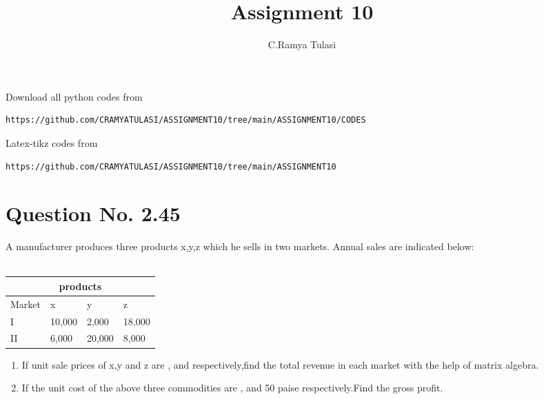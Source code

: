 \documentclass[journal,12pt,twocolumn]{IEEEtran}
\begin{document}
     \def\rightbox#1{\makebox[0in][r]{#1}}
     \def\centbox#1{\makebox[0in]{#1}}
     \def\topbox#1{\raisebox{-\baselineskip}[0in][0in]{#1}}
     \def\midbox#1{\raisebox{-0.5\baselineskip}[0in][0in]{#1}}
\vspace{3cm}
\title{Assignment 10}
\author{C.Ramya Tulasi}
\maketitle
\newpage
\bigskip
\renewcommand{\thefigure}{\theenumi}
\renewcommand{\thetable}{\theenumi}
Download all python codes from 
\begin{lstlisting}
https://github.com/CRAMYATULASI/ASSIGNMENT10/tree/main/ASSIGNMENT10/CODES
\end{lstlisting}
%
Latex-tikz codes from 
%
\begin{lstlisting}
https://github.com/CRAMYATULASI/ASSIGNMENT10/tree/main/ASSIGNMENT10
\end{lstlisting}
%
\section{Question No. 2.45}

A manufacturer produces three products x,y,z which he sells in two markets. Annual sales are indicated below:
\\\\
\begin{tabular}{ |p{2cm}||p{1.5cm}|p{1.5cm}|p{1.5cm}|}
 \hline
 \multicolumn{4}{|c|}{products}\\
 \hline
Market & x & y &z\\
 \hline
I &10,000 &2,000 &18,000\\
\hline
 II &6,000 &20,000 &8,000\\
\hline
\end{tabular}
\begin{enumerate}
\item If unit sale prices of x,y and z are , and  respectively,find the total revenue in each market with the help of matrix algebra.
\item If the unit cost of the above three commodities are , and 50 paise respectively.Find the gross profit.
\end{enumerate}
\end{document}
